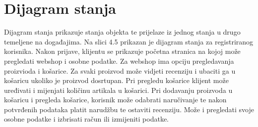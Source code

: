			
			
			
			
			
			\eject
		
		\section{Dijagram stanja}
			
			
			
			\textnormal{Dijagram stanja prikazuje stanja objekta te prijelaze iz jednog stanja u drugo temeljene na događajima. Na slici 4.5 prikazan je dijagram stanja za registriranog korisnika. Nakon prijave, klijentu se prikazuje početna stranica na kojoj može pregledati webshop i osobne podatke. Za  webshop ima opciju pregledavanja proizvioda i košarice. Za svaki proizvod može vidjeti recenziju i ubaciti ga u košaricu ukoliko je proizvod dosrtupan. Pri pregledu košarice klijent može  uređivati i mijenjati količinu artikala u košarici. Pri dodavanju proizvoda u košaricu i pregleda košarice, korisnik može odabrati naručivanje te nakon potvrđenih podataka platit narudžbu te ostaviti recenziju. Može i pregledati svoje osobne podatke i izbrisati račun ili izmijeniti podatke.}
			
